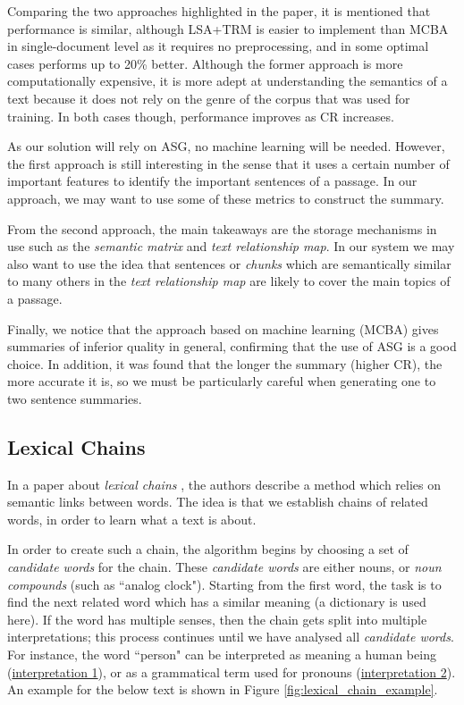 Comparing the two approaches highlighted in the paper, it is mentioned that performance is similar, although LSA+TRM is easier to implement than MCBA in single-document level as it requires no preprocessing, and in some optimal cases performs up to 20\% better. Although the former approach is more computationally expensive, it is more adept at understanding the semantics of a text because it does not rely on the genre of the corpus that was used for training. In both cases though, performance improves as CR increases.

\mbox{}

As our solution will rely on ASG, no machine learning will be needed. However, the first approach is still interesting in the sense that it uses a certain number of important features to identify the important sentences of a passage. In our approach, we may want to use some of these metrics to construct the summary.

From the second approach, the main takeaways are the storage mechanisms in use such as the \textit{semantic matrix} and \textit{text relationship map}. In our system we may also want to use the idea that sentences or \textit{chunks} which are semantically similar to many others in the \textit{text relationship map} are likely to cover the main topics of a passage.

Finally, we notice that the approach based on machine learning (MCBA) gives summaries of inferior quality in general, confirming that the use of ASG is a good choice. In addition, it was found that the longer the summary (higher CR), the more accurate it is, so we must be particularly careful when generating one to two sentence summaries.

\subsection{Lexical Chains}

In a paper about \textit{lexical chains} \cite{barzilay_using_1997}, the authors describe a method which relies on semantic links between words. The idea is that we establish chains of related words, in order to learn what a text is about.

In order to create such a chain, the algorithm begins by choosing a set of \textit{candidate words} for the chain. These \textit{candidate words} are either nouns, or \textit{noun compounds} (such as ``analog clock"). Starting from the first word, the task is to find the next related word which has a similar meaning (a dictionary is used here). If the word has multiple senses, then the chain gets split into multiple interpretations; this process continues until we have analysed all \textit{candidate words}.  For instance, the word ``person" can be interpreted as meaning a human being (\underline{interpretation 1}), or as a grammatical term used for pronouns (\underline{interpretation 2}). An example for the below text is shown in Figure \ref{fig:lexical_chain_example}.

